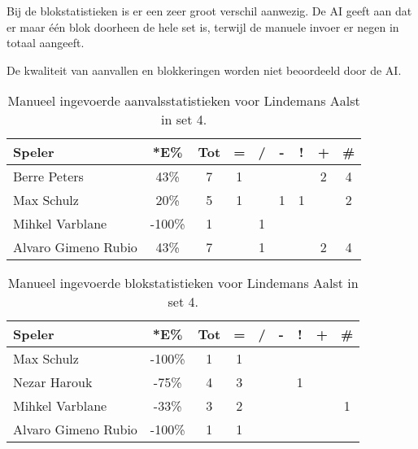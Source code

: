Bij de blokstatistieken is er een zeer groot verschil aanwezig. De AI geeft aan dat er maar één blok doorheen de hele set is, terwijl de manuele invoer er negen in totaal aangeeft.

De kwaliteit van aanvallen en blokkeringen worden niet beoordeeld door de AI. 

\begin{table}[ht!]
    \centering
    \scriptsize
    \begin{tabular}{|l|c|c|c|c|c|c|c|c|}
        \hline
        \textbf{Speler} & *E\% & Tot & = & / & - & ! & + & \# \\ \hline
        Berre Peters & 43\% & 7 & 1 &  &  & & 2 & 4 \\ 
        Max Schulz & 20\% & 5 & 1 &  & 1 & 1 & & 2 \\ 
        Mihkel Varblane & -100\% & 1 &  & 1 &  &  &  & \\ 
        Alvaro Gimeno Rubio & 43\% & 7 &  & 1 & & & 2 & 4 \\ \hline
    \end{tabular}
    \caption[Manueel ingevoerde aanvalsstatistieken voor Lindemans Aalst in set 4]{\label{tab:PL3AttAalstMan4}Manueel ingevoerde aanvalsstatistieken voor Lindemans Aalst in set 4.}
\end{table}

\begin{table}[ht!]
    \centering
    \scriptsize
    \begin{tabular}{|l|c|c|c|c|c|c|c|c|}
        \hline
        \textbf{Speler} & *E\% & Tot & = & / & - & ! & + & \# \\ \hline
        Max Schulz & -100\% & 1 & 1 &  &  &  &  & \\
        Nezar Harouk & -75\% & 4 & 3 & &  & 1 &  & \\ 
        Mihkel Varblane & -33\% & 3 & 2 &  &  & &  & 1 \\ 
        Alvaro Gimeno Rubio & -100\% & 1 & 1 &  &  &  &  & \\  \hline
    \end{tabular}
    \caption[Manueel ingevoerde blokstatistieken voor Lindemans Aalst in set 4]{\label{tab:PL3BlockAalstMan4}Manueel ingevoerde blokstatistieken voor Lindemans Aalst in set 4.}
\end{table}


